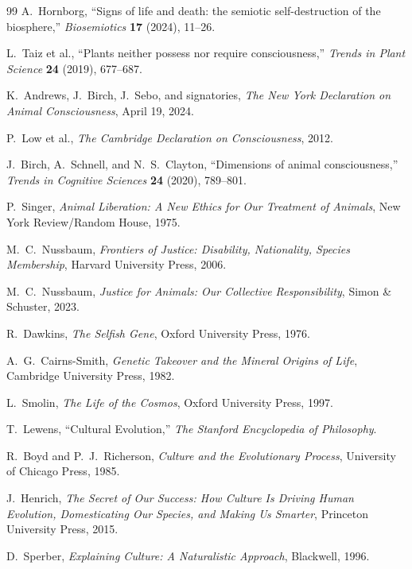 \documentclass[11pt]{article}
\theoremstyle{remark}
\theoremstyle{plain}
\begin{document}
\begin{thebibliography}{99}
A.\ Hornborg,
``Signs of life and death: the semiotic self-destruction of the biosphere,''
\emph{Biosemiotics} \textbf{17} (2024), 11--26.

L.\ Taiz et al.,
``Plants neither possess nor require consciousness,''
\emph{Trends in Plant Science} \textbf{24} (2019), 677--687.

K.\ Andrews, J.\ Birch, J.\ Sebo, and signatories,
\emph{The New York Declaration on Animal Consciousness},
April 19, 2024.

P.\ Low et al.,
\emph{The Cambridge Declaration on Consciousness},
2012.

J.\ Birch, A.\ Schnell, and N.\ S.\ Clayton,
``Dimensions of animal consciousness,''
\emph{Trends in Cognitive Sciences} \textbf{24} (2020), 789--801.

P.\ Singer,
\emph{Animal Liberation: A New Ethics for Our Treatment of Animals},
New York Review/Random House, 1975.

M.\ C.\ Nussbaum,
\emph{Frontiers of Justice: Disability, Nationality, Species Membership},
Harvard University Press, 2006.

M.\ C.\ Nussbaum,
\emph{Justice for Animals: Our Collective Responsibility},
Simon \& Schuster, 2023.

R.\ Dawkins,
\emph{The Selfish Gene},
Oxford University Press, 1976.

A.\ G.\ Cairns-Smith,
\emph{Genetic Takeover and the Mineral Origins of Life},
Cambridge University Press, 1982.

L.\ Smolin,
\emph{The Life of the Cosmos},
Oxford University Press, 1997.

T.\ Lewens,
``Cultural Evolution,''
\emph{The Stanford Encyclopedia of Philosophy}.

R.\ Boyd and P.\ J.\ Richerson,
\emph{Culture and the Evolutionary Process},
University of Chicago Press, 1985.

J.\ Henrich,
\emph{The Secret of Our Success: How Culture Is Driving Human Evolution, Domesticating Our Species, and Making Us Smarter},
Princeton University Press, 2015.

D.\ Sperber,
\emph{Explaining Culture: A Naturalistic Approach},
Blackwell, 1996.


\end{thebibliography}
\end{document}
